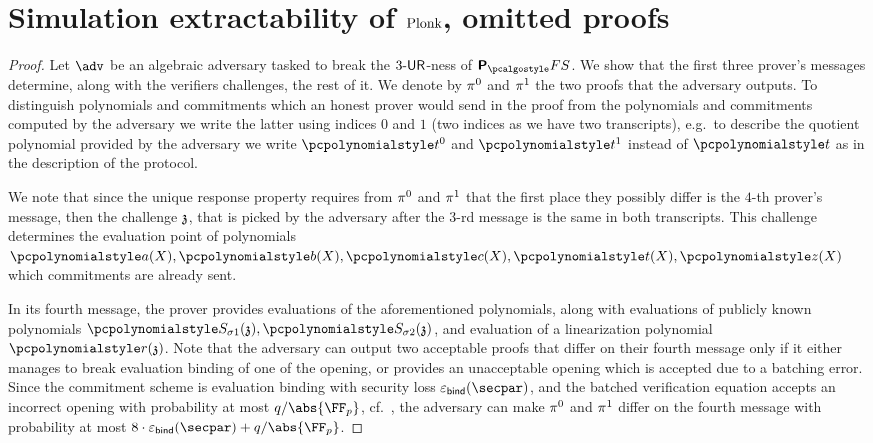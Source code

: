 \section{Simulation extractability of $\textnormal{{Plonk}}$, omitted proofs}
\label{sec:plonkse_proofs}


\begin{proof}
    Let $\adv$ be an algebraic adversary tasked to break the ${3\text{-}\mathsf{UR}}$-ness of
      $\plonkprotfs$. We show that the first three prover's messages determine, along with 	the verifiers challenges, the rest of it. We denote by $\pi^0$ and $\pi^1$ the two proofs that the adversary outputs. To distinguish polynomials and commitments which an honest prover would send in the proof from the polynomials and commitments computed by the adversary we write the latter using indices $0$ and $1$ (two indices as we have two transcripts), e.g.~to describe the quotient polynomial provided by the adversary we write $\p{t}^0$ and $\p{t}^1$ instead of $\p{t}$ as in the description of the protocol.
  
    We note that since the unique response property requires from $\pi^{0}$ and $\pi^{1}$ that the first place they possibly differ is the $4$-th prover's message, then the challenge $\mathfrak{z}$, that is picked by the adversary after the $3$-rd message is the same in both transcripts. This challenge determines the evaluation point of polynomials $\p{a}(X), \p{b}(X), \p{c}(X), \p{t}(X), \p{z}(X)$ which commitments are already sent.
  
    In its fourth message, the prover provides evaluations of the aforementioned polynomials, along with evaluations of publicly known polynomials $
    \p{S_{\sigma 1}} (\chz), \p{S_{\sigma 2}} (\chz)$, and evaluation of a linearization polynomial $\p{r}(\chz)$.
    Note that the adversary can output two acceptable proofs that differ on their fourth message only if it either manages to break evaluation binding of one of the opening, or provides an unacceptable opening which is accepted due to a batching error. Since the commitment scheme is evaluation binding with security loss $\epsbinding (\secpar)$, and the batched verification equation accepts an incorrect opening with probability at most $\infrac{q}{\abs{\FF_p}}$, cf.~\cite{EPRINT:GabWilCio19}, the adversary can make $\pi^{0}$ and $\pi^{1}$ differ on the fourth message with probability at most $8  \cdot \epsbinding (\secpar) + \infrac{q}{\abs{\FF_p}}$. 
  

\end{proof}
